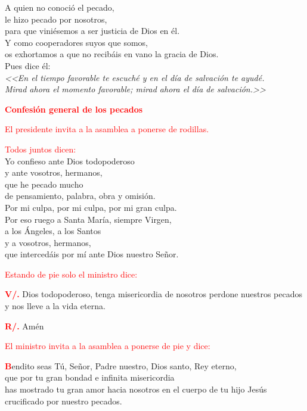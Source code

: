 \documentclass[12pt, letterpaper]{report}
\begin{document}
\noindent
\Large {A quien no conoci\'o el pecado,\\
le hizo pecado por nosotros,\\
para que vini\'esemos a ser justicia de Dios en \'el.\\
Y como cooperadores suyos que somos,\\
os exhortamos a que no recib\'ais en vano la gracia de Dios.\\
Pues dice \'el:\\
\em <<En el tiempo favorable te escuch\'e y en el d\'ia de salvaci\'on te ayud\'e.\\
Mirad ahora el momento favorable; mirad ahora el d\'ia de salvaci\'on.>>
}

\newpage

\Large {\bfseries \textcolor{red}{Confesi\'on general de los pecados}}

\large {\textcolor{red}{El presidente invita a la asamblea a ponerse de rodillas.}}

\large {\textcolor{red}{Todos juntos dicen:}}\\
\Large {Yo confieso ante Dios todopoderoso\\
y ante vosotros, hermanos,\\
que he pecado mucho\\
de pensamiento, palabra, obra y omisi\'on.\\
Por mi culpa, por mi culpa, por mi gran culpa.\\
Por eso ruego a Santa Mar\'ia, siempre Virgen,\\
a los \'Angeles, a los Santos\\
y a vosotros, hermanos,\\
que interced\'ais por m\'i ante Dios nuestro Se\~nor.}

\large {\textcolor{red}{Estando de pie solo el ministro dice:}}

\noindent
\Large {\bfseries \textcolor{red}{V/.}}\Large { Dios todopoderoso, tenga misericordia de nosotros
perdone nuestros pecados y nos lleve a la vida eterna.}

\noindent
\Large {\bfseries \textcolor{red}{R/.}} \hspace{0.5cm} Am\'en

\large {\textcolor{red}{El ministro invita a la asamblea a ponerse de pie y dice:}}

\lettrine[lines=2]{\bfseries \textcolor{red}{B}}{}\Large {endito seas T\'u, Se\~nor, Padre nuestro, Dios santo, Rey eterno,\\
que por tu gran bondad e infinita misericordia\\
has mostrado tu gran amor hacia nosotros en el cuerpo de tu hijo Jes\'us\\
crucificado por nuestro pecados.}
\end{document}
